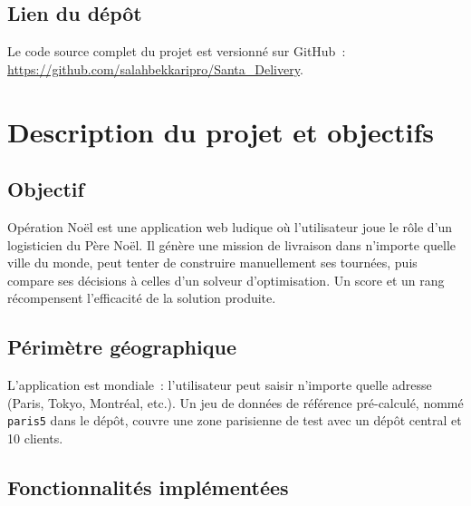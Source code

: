 \documentclass[a4paper, 12pt, twoside]{article}
\begin{document}
\subsection{Lien du d\'{e}p\^{o}t}

Le code source complet du projet est versionn\'{e} sur GitHub~:
\url{https://github.com/salahbekkaripro/Santa_Delivery}.

\section{Description du projet et objectifs}

\subsection{Objectif}

Op\'{e}ration No\"{e}l est une application web ludique o\`{u} l'utilisateur joue le r\^{o}le d'un
logisticien du P\`{e}re No\"{e}l. Il g\'{e}n\`{e}re une mission de livraison dans n'importe quelle
ville du monde, peut tenter de construire manuellement ses tourn\'{e}es, puis compare ses d\'{e}cisions
\`{a} celles d'un solveur d'optimisation. Un score et un rang r\'{e}compensent l'efficacit\'{e}
de la solution produite.

\subsection{P\'{e}rim\`{e}tre g\'{e}ographique}

L'application est mondiale~: l'utilisateur peut saisir n'importe quelle adresse (Paris, Tokyo,
Montr\'{e}al, etc.). Un jeu de donn\'{e}es de r\'{e}f\'{e}rence pr\'{e}-calcul\'{e}, nomm\'{e}
\texttt{paris5} dans le d\'{e}p\^{o}t, couvre une zone parisienne de test avec un d\'{e}p\^{o}t
central et 10 clients.

\subsection{Fonctionnalit\'{e}s impl\'{e}ment\'{e}es}
\end{document}
